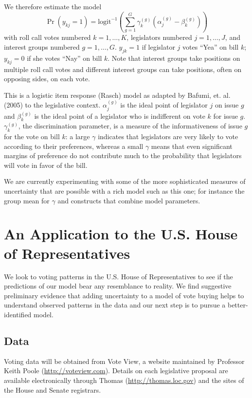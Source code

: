 \documentclass[12pt]{article}
\newcommand{\ga}{\gamma}
\begin{document}
We therefore estimate the model
\begin{equation}
  \Pr(y_{kj} = 1) = \text{logit}^{-1}\left( \sum_{g=1}^G \ga_k^{(g)}\left( \alpha_j^{(g)} - \beta_k^{(g)}\right) \right)
	\label{eq:v2}
\end{equation}
with roll call votes numbered $k=1,\ldots,K$, legislators numbered $j=1,\dots,J$, and interest groups numbered $g=1,\dots,G$. $y_{jk}=1$ if legislator $j$ votes ``Yea'' on bill $k$; $y_{kj}=0$ if she votes ``Nay'' on bill $k$. Note that interest groups take positions on multiple roll call votes and different interest groups can take positions, often on opposing sides, on each vote.
		
This is a logistic item response (Rasch) model as adapted by Bafumi, et. al. (2005) to the legislative context. $\alpha_j^{(g)}$ is the ideal point of legislator $j$ on issue $g$ and $\beta_k^{(g)}$ is the ideal point of a legislator who is indifferent on vote $k$ for issue $g$. $\gamma_k^{(g)}$, the discrimination parameter, is a measure of the informativeness of issue $g$ for the vote on bill $k$: a large $\ga$ indicates that legislators are very likely to vote according to their preferences, whereas a small $\ga$ means that even significant margins of preference do not contribute much to the probability that legislators will vote in favor of the bill.

We are currently experimenting with some of the more sophisticated measures of uncertainty that are possible with a rich model such as this one; for instance the group mean for $\ga$ and constructs that combine model parameters.


\section{An Application to the U.S. House of Representatives}
\label{sec:house}
We look to voting patterns in the U.S. House of Representatives to see if the predictions of our model bear any resemblance to reality. We find suggestive preliminary evidence that adding uncertainty to a model of vote buying helps to understand observed patterns in the data and our next step is to pursue a better-identified model.


\subsection{Data}
Voting data will be obtained from Vote View, a website maintained by Professor Keith Poole (\url{http://voteview.com}). Details on each legislative proposal are available electronically through Thomas (\url{http://thomas.loc.gov}) and the sites of the House and Senate registrars.
\end{document}
